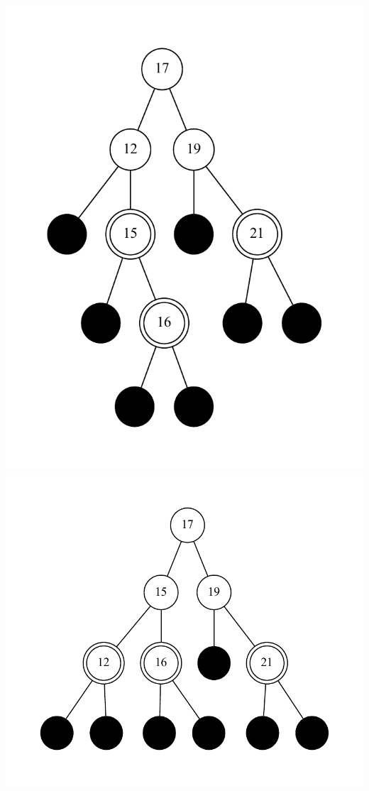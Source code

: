 \documentclass[11pt]{article}
\begin{document}
\includegraphics{step11.pdf}\\
\includegraphics{step12.pdf}
	\bigskip
	
\end{document}
